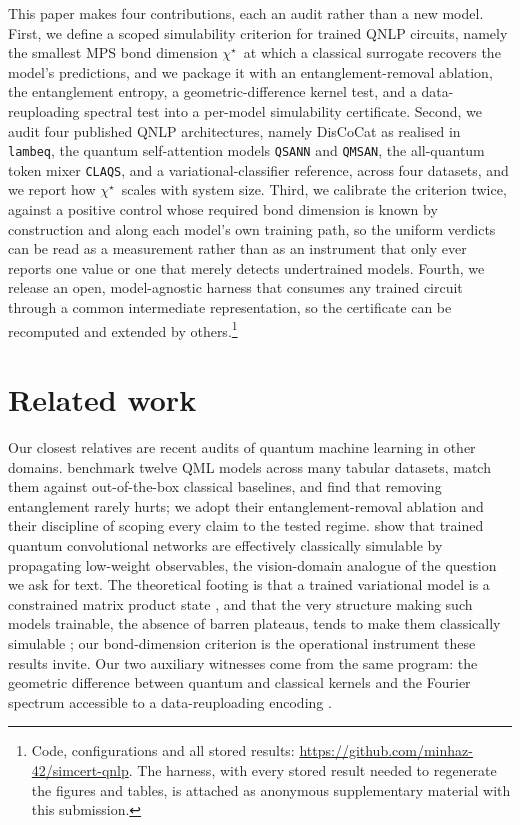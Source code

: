 \documentclass[10pt]{article}
\makeatletter
\newcommand{\chistar}{\ensuremath{\chi^\star}}
\newcommand{\repoavailability}{%
  \if@preprint
    Code, configurations and all stored results:
    \url{https://github.com/minhaz-42/simcert-qnlp}.%
  \else
    The harness, with every stored result needed to regenerate the figures and tables, is
    attached as anonymous supplementary material with this submission.%
  \fi}
\makeatother
\begin{document}
This paper makes four contributions, each an audit rather than a new model. First, we define a
scoped simulability criterion for trained QNLP circuits, namely the smallest MPS bond dimension
\chistar\ at which a classical surrogate recovers the model's predictions, and we package it with
an entanglement-removal ablation, the entanglement entropy, a geometric-difference kernel test,
and a data-reuploading spectral test into a per-model simulability certificate. Second, we audit
four published QNLP architectures, namely DisCoCat as realised in \texttt{lambeq}, the quantum
self-attention models \texttt{QSANN} and \texttt{QMSAN}, the all-quantum token mixer
\texttt{CLAQS}, and a variational-classifier reference, across four datasets, and we report how
\chistar\ scales with system size. Third, we calibrate the criterion twice, against a positive control whose required bond dimension
is known by construction and along each model's own training path, so the uniform verdicts can be
read as a measurement rather than as an instrument that only ever reports one value or one that
merely detects undertrained models. Fourth, we release an open, model-agnostic harness
that consumes any trained circuit through a common intermediate representation, so the certificate
can be recomputed and extended by others.\footnote{\repoavailability}


\section{Related work}
\label{sec:related}
Our closest relatives are recent audits of quantum machine learning in other domains.
\citet{bowles2024} benchmark twelve QML models across many tabular datasets, match them against
out-of-the-box classical baselines, and find that removing entanglement rarely hurts; we adopt
their entanglement-removal ablation and their discipline of scoping every claim to the tested
regime. \citet{bermejo2024} show that trained quantum convolutional networks are effectively
classically simulable by propagating low-weight observables, the vision-domain analogue of the
question we ask for text. The theoretical footing is that a trained variational model is a
constrained matrix product state \citep{shin2024}, and that the very structure making such models
trainable, the absence of barren plateaus, tends to make them classically simulable
\citep{cerezo2025}; our bond-dimension criterion is the operational instrument these results
invite. Our two auxiliary witnesses come from the same program: the geometric difference between
quantum and classical kernels \citep{huang2021} and the Fourier spectrum accessible to a
data-reuploading encoding \citep{schuld2021}.
\end{document}
